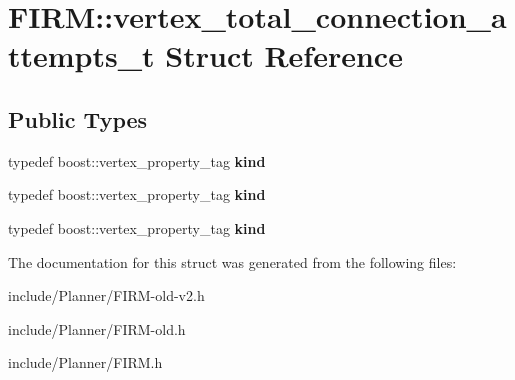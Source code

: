 \hypertarget{struct_f_i_r_m_1_1vertex__total__connection__attempts__t}{\section{\-F\-I\-R\-M\-:\-:vertex\-\_\-total\-\_\-connection\-\_\-attempts\-\_\-t \-Struct \-Reference}
\label{struct_f_i_r_m_1_1vertex__total__connection__attempts__t}
}
\subsection*{\-Public \-Types}
\begin{DoxyCompactItemize}
\item 
\hypertarget{struct_f_i_r_m_1_1vertex__total__connection__attempts__t_afb2aba317a24c9d5032e85713f69f8d0}{typedef boost\-::vertex\-\_\-property\-\_\-tag {\bfseries kind}}\label{struct_f_i_r_m_1_1vertex__total__connection__attempts__t_afb2aba317a24c9d5032e85713f69f8d0}

\item 
\hypertarget{struct_f_i_r_m_1_1vertex__total__connection__attempts__t_afb2aba317a24c9d5032e85713f69f8d0}{typedef boost\-::vertex\-\_\-property\-\_\-tag {\bfseries kind}}\label{struct_f_i_r_m_1_1vertex__total__connection__attempts__t_afb2aba317a24c9d5032e85713f69f8d0}

\item 
\hypertarget{struct_f_i_r_m_1_1vertex__total__connection__attempts__t_afb2aba317a24c9d5032e85713f69f8d0}{typedef boost\-::vertex\-\_\-property\-\_\-tag {\bfseries kind}}\label{struct_f_i_r_m_1_1vertex__total__connection__attempts__t_afb2aba317a24c9d5032e85713f69f8d0}

\end{DoxyCompactItemize}


\-The documentation for this struct was generated from the following files\-:\begin{DoxyCompactItemize}
\item 
include/\-Planner/\-F\-I\-R\-M-\/old-\/v2.\-h\item 
include/\-Planner/\-F\-I\-R\-M-\/old.\-h\item 
include/\-Planner/\-F\-I\-R\-M.\-h\end{DoxyCompactItemize}
